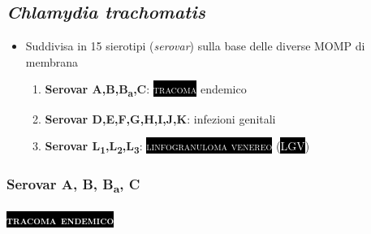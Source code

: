 \documentclass[italian,]{article}
\providecommand{\tightlist}{%
  \setlength{\itemsep}{0pt}\setlength{\parskip}{0pt}}
\newcommand{\pat}[1]{\colorbox{black}{\textcolor{white}{\textsc{#1}}}}
\begin{document}
\hypertarget{chlamydia-trachomatis}{%
\subsection{\texorpdfstring{\emph{Chlamydia
trachomatis}}{Chlamydia trachomatis}}\label{chlamydia-trachomatis}}

\begin{itemize}
\tightlist
\item
  Suddivisa in 15 sierotipi (\emph{serovar}) sulla base delle diverse
  MOMP di membrana

  \begin{enumerate}
  \def\labelenumi{\arabic{enumi}.}
  \tightlist
  \item
    \textbf{Serovar A,B,B\textsubscript{a},C}: \pat{tracoma} endemico
  \item
    \textbf{Serovar D,E,F,G,H,I,J,K}: infezioni genitali
  \item
    \textbf{Serovar
    L\textsubscript{1},L\textsubscript{2},L\textsubscript{3}}:
    \pat{linfogranuloma venereo} (\pat{LGV})
  \end{enumerate}
\end{itemize}

\hypertarget{serovar-a-b-ba-c}{%
\subsubsection{\texorpdfstring{Serovar A, B, B\textsubscript{a},
C}{Serovar A, B, Ba, C}}\label{serovar-a-b-ba-c}}

\hypertarget{section-9}{%
\paragraph{\texorpdfstring{\pat{tracoma endemico}}{}}\label{section-9}}
\end{document}
